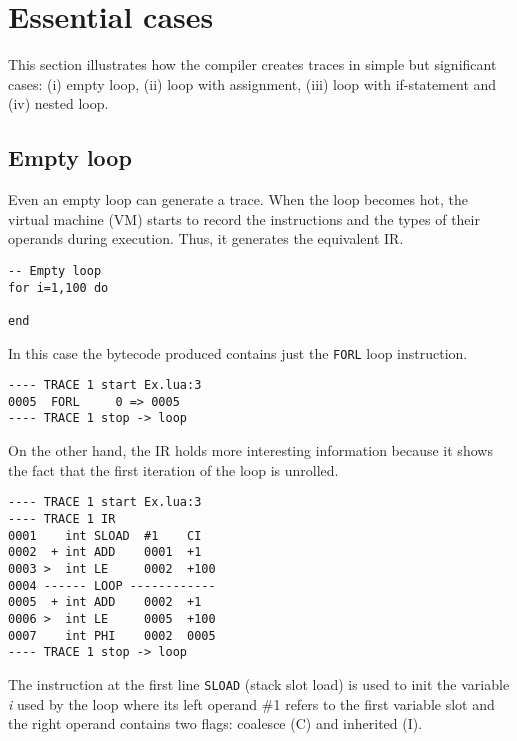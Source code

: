 \section{Essential cases}
This section illustrates how the compiler creates traces in simple but significant cases: (i) empty loop, (ii) loop with assignment, (iii) loop with if-statement and (iv) nested loop.

\subsection{Empty loop}
Even an empty loop can generate a trace. When the loop becomes hot, the virtual machine (VM) starts to record the instructions and the types of their operands during execution. Thus, it generates the equivalent IR. 

\begin{mdframed}[style=LuaStyleFrame]
\begin{lstlisting}[style=LuaStyle]
-- Empty loop
for i=1,100 do

end
\end{lstlisting}
\end{mdframed}

\noindent
In this case the bytecode produced contains just the \texttt{FORL} loop instruction.

\begin{lstlisting}[style=DumpStyle]
---- TRACE 1 start Ex.lua:3
0005  FORL     0 => 0005
---- TRACE 1 stop -> loop
\end{lstlisting}

\noindent
On the other hand, the IR holds more interesting information because it shows the fact that the first iteration of the loop is unrolled.

\begin{lstlisting}[style=DumpStyle]
---- TRACE 1 start Ex.lua:3
---- TRACE 1 IR
0001    int SLOAD  #1    CI
0002  + int ADD    0001  +1  
0003 >  int LE     0002  +100
0004 ------ LOOP ------------
0005  + int ADD    0002  +1  
0006 >  int LE     0005  +100
0007    int PHI    0002  0005
---- TRACE 1 stop -> loop
\end{lstlisting}

\noindent
The instruction at the first line \texttt{SLOAD} (stack slot load) is used to init the variable \textit{i} used by the loop where its left operand \#1 refers to the first variable slot and the right operand contains two flags: coalesce (C) and inherited (I).

